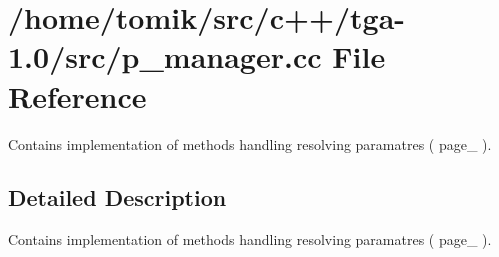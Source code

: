 \section{/home/tomik/src/c++/tga-\/1.0/src/p\_\-manager.cc File Reference}
\label{p__manager_8cc}


Contains implementation of methods handling resolving paramatres ( page\_ ).  




\subsection{Detailed Description}
Contains implementation of methods handling resolving paramatres ( page\_ ). 
